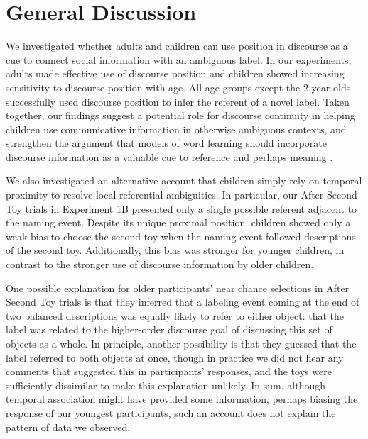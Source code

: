 \documentclass[man]{apa2}
\begin{document}
\section{General Discussion} 

We investigated whether adults and children can use position in discourse as a cue to connect social information with an ambiguous label. In our experiments, adults made effective use of discourse position and children showed increasing sensitivity to discourse position with age. All age groups except the 2-year-olds successfully used discourse position to infer the referent of a novel label. Taken together, our findings suggest a potential role for discourse continuity in helping children use communicative information in otherwise ambiguous contexts, and strengthen the argument that models of word learning should incorporate discourse information as a valuable cue to reference and perhaps meaning \cite{luong2013}.

We also investigated an alternative account that children simply rely on temporal proximity to resolve local referential ambiguities.  In particular, our After Second Toy trials in Experiment 1B presented only a single possible referent adjacent to the naming event.  Despite its unique proximal position, children showed only a weak bias to choose the second toy when the naming event followed descriptions of the second toy.   Additionally, this bias was stronger for younger children, in contrast to the stronger use of discourse information by older children. 

One possible explanation for older participants' near chance selections in After Second Toy trials is that they inferred that a labeling event coming at the end of two balanced descriptions was equally likely to refer to either object: that the label was related to the higher-order discourse goal of discussing this set of objects as a whole. In principle, another possibility is that they guessed that the label referred to both objects at once, though in practice we did not hear any comments that suggested this in participants' responses, and the toys were sufficiently dissimilar to make this explanation unlikely. In sum, although temporal association might have provided some information, perhaps biasing the response of our youngest participants, such an account does not explain the pattern of data we observed.  
\end{document}
